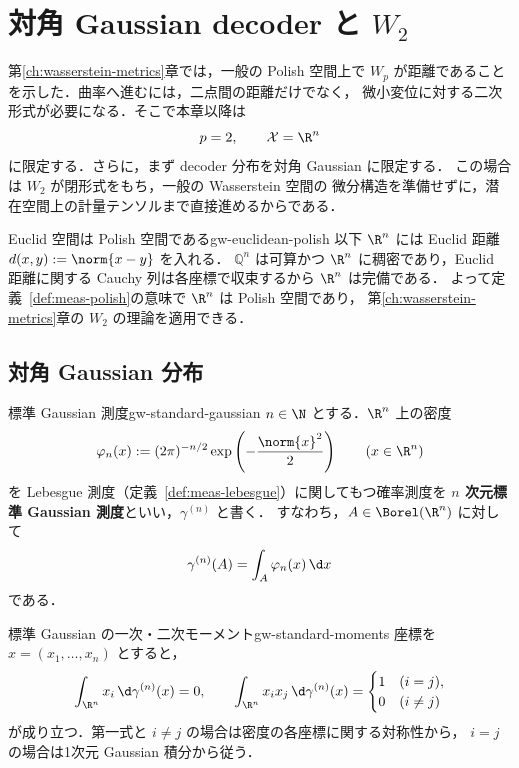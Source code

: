 \chapter{対角 Gaussian decoder と \texorpdfstring{$W_2$}{W2}}
\label{ch:gaussian-w2}

第\ref{ch:wasserstein-metrics}章では，一般の Polish 空間上で
$W_p$ が距離であることを示した．曲率へ進むには，二点間の距離だけでなく，
微小変位に対する二次形式が必要になる．そこで本章以降は
\[
  p=2,\qquad \mathcal{X}=\R^n
\]
に限定する．さらに，まず decoder 分布を対角 Gaussian に限定する．
この場合は $W_2$ が閉形式をもち，一般の Wasserstein 空間の
微分構造を準備せずに，潜在空間上の計量テンソルまで直接進めるからである．

\begin{remark}{Euclid 空間は Polish 空間である}{gw-euclidean-polish}
  以下 $\R^n$ には Euclid 距離 $d(x,y):=\norm{x-y}$ を入れる．
  $\mathbb{Q}^n$ は可算かつ $\R^n$ に稠密であり，Euclid 距離に関する
  Cauchy 列は各座標で収束するから $\R^n$ は完備である．
  よって定義~\ref{def:meas-polish}の意味で $\R^n$ は Polish 空間であり，
  第\ref{ch:wasserstein-metrics}章の $W_2$ の理論を適用できる．
\end{remark}

\section{対角 Gaussian 分布}
\label{sec:gw-gaussian}

\begin{definition}{標準 Gaussian 測度}{gw-standard-gaussian}
  $n\in\N$ とする．$\R^n$ 上の密度
  \[
    \varphi_n(x):=(2\pi)^{-n/2}\exp\left(-\frac{\norm{x}^2}{2}\right)
    \qquad(x\in\R^n)
  \]
  を Lebesgue 測度（定義~\ref{def:meas-lebesgue}）に関してもつ確率測度を
  \textbf{$n$ 次元標準 Gaussian 測度}といい，$\gamma^{(n)}$ と書く．
  すなわち，$A\in\Borel(\R^n)$ に対して
  \[
    \gamma^{(n)}(A)=\int_A\varphi_n(x)\,\d x
  \]
  である．
\end{definition}

\begin{remark}{標準 Gaussian の一次・二次モーメント}{gw-standard-moments}
  座標を $x=(x_1,\dots,x_n)$ とすると，
  \[
    \int_{\R^n}x_i\,\d\gamma^{(n)}(x)=0,
    \qquad
    \int_{\R^n}x_ix_j\,\d\gamma^{(n)}(x)
    =\begin{cases}1&(i=j),\\0&(i\neq j)\end{cases}
  \]
  が成り立つ．第一式と $i\neq j$ の場合は密度の各座標に関する対称性から，
  $i=j$ の場合は1次元 Gaussian 積分から従う．
\end{remark}

